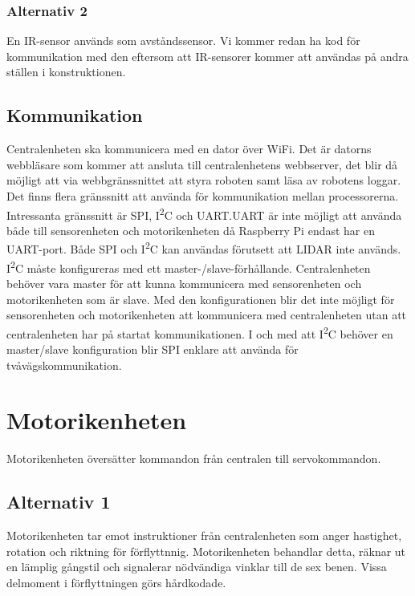 \documentclass[a4paper,titlepage,12pt]{article}
\newcommand{\itc}{I\textsuperscript{2}C}
\begin{document}
	\subsubsection{Alternativ 2}
	En IR-sensor används som avståndssensor. Vi kommer redan ha  kod för kommunikation med
	den  eftersom att IR-sensorer kommer att användas på andra ställen i konstruktionen. 
	
	\subsection{Kommunikation}
	Centralenheten ska kommunicera med en dator över WiFi. Det är datorns webbläsare 
	som kommer att ansluta till centralenhetens webbserver, det blir då möjligt att
	via webbgränssnittet att styra roboten samt läsa av robotens loggar. Det finns
	flera gränssnitt att 
	använda för kommunikation mellan processorerna. Intressanta gränssnitt är SPI, 
	\itc{} och UART.\@ UART är inte möjligt att använda både till sensorenheten och 
	motorikenheten då Raspberry Pi endast har en UART-port. Både 
	SPI och \itc{} kan användas förutsett att LIDAR inte används. \itc{} måste konfigureras med ett
	master-/slave-förhållande. Centralenheten behöver vara master för att kunna
	kommunicera med 
	sensorenheten och motorikenheten som är slave. Med den konfigurationen blir 
	det inte möjligt för sensorenheten och motorikenheten att kommunicera med
	centralenheten utan att centralenheten har på startat kommunikationen. I och 
	med att \itc{} behöver en master/slave konfiguration blir SPI enklare att använda 
	för tvåvägskommunikation. 

	
	\section{Motorikenheten}
	Motorikenheten översätter kommandon från centralen till servokommandon. 

	\subsection{Alternativ 1}
	Motorikenheten tar emot instruktioner från centralenheten som anger hastighet, 
	rotation och riktning för förflyttnnig. Motorikenheten behandlar detta, räknar ut en 
	lämplig 
	gångstil och signalerar nödvändiga vinklar till de sex benen. Vissa delmoment i 
	förflyttningen görs hårdkodade. 
	
\end{document}
